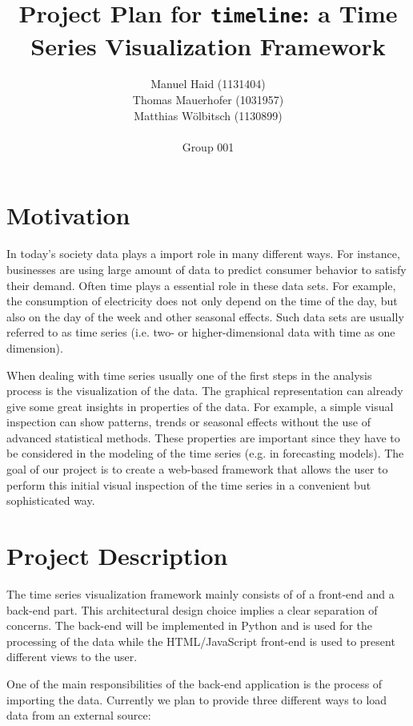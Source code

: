 \documentclass[12pt, a4paper]{article}
\author{Manuel Haid (1131404) \\ Thomas Mauerhofer (1031957) \\ Matthias Wölbitsch (1130899) \\ \\ Group 001}
\title{Project Plan for \texttt{timeline}: a Time Series Visualization Framework}
\date{}
\begin{document}
\maketitle


\section{Motivation}

In today's society data plays a import role in many different ways.
For instance, businesses are using large amount of data to predict consumer behavior to satisfy their demand.
Often time plays a essential role in these data sets. 
For example, the consumption of electricity does not only depend on the time of the day, but also on the day of the week and other seasonal effects.
Such data sets are usually referred to as time series (i.e. two- or higher-dimensional data with time as one dimension). 

When dealing with time series usually one of the first steps in the analysis process is the visualization of the data.
The graphical representation can already give some great insights in properties of the data.
For example, a simple visual inspection can show patterns, trends or seasonal effects without the use of advanced statistical methods. 
These properties are important since they have to be considered in the modeling of the time series (e.g. in forecasting models).
The goal of our project is to create a web-based framework that allows the user to perform this initial visual inspection of the time series in a convenient but sophisticated way.


\section{Project Description}

The time series visualization framework mainly consists of of a front-end and a back-end part.
This architectural design choice implies a clear separation of concerns. 
The back-end will be implemented in Python and is used for the processing of the data while the HTML/JavaScript front-end is used to present different views to the user.

One of the main responsibilities of the back-end application is the process of importing the data.
Currently we plan to provide three different ways to load data from an external source:
\end{document}
